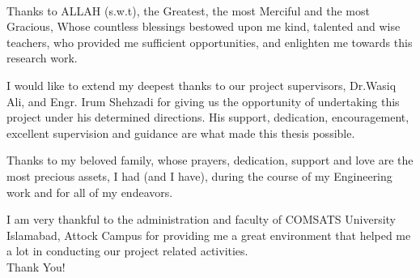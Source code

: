 \begin{titlepage}
\begin{center}
 \\
\end{center}
  \vspace*{0.5cm}
\noindent Thanks to ALLAH (s.w.t), the Greatest, the most Merciful and the most Gracious, Whose countless blessings bestowed upon me kind, talented and wise teachers, who provided me sufficient opportunities, and enlighten me towards this research work.\vspace{.25cm}

\noindent I would like to extend my deepest thanks to our project supervisors, Dr.Wasiq Ali, and Engr. Irum Shehzadi for giving us the opportunity of undertaking this project under his determined directions. His support, dedication, encouragement, excellent supervision and guidance are what made this thesis possible. \vspace{.25cm}

\noindent Thanks to my beloved family, whose prayers, dedication, support and love are the most precious assets, I had (and I have), during the course of my Engineering work and for all of my endeavors.\vspace{.25cm}

\noindent I am very thankful to the administration and faculty of COMSATS University Islamabad, Attock Campus for providing me a great environment that helped me a lot in conducting our project related activities. \vspace{5mm} \\


\noindent Thank You!






\end{titlepage}
